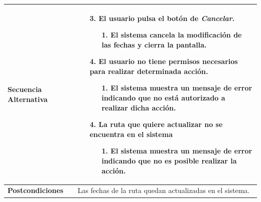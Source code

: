 \begin{longtable}{| p{4cm} | p{10cm} |}
\hline
\textbf{Secuencia Alternativa} &\mbox{}\par\vspace{-\baselineskip}
\begin{enumerate}[leftmargin=0.9cm, topsep=0.1cm]
\item[3.] El usuario pulsa el botón de \textit{Cancelar}.
	\begin{itemize}
	\item[1.] El sistema cancela la modificación de las fechas y cierra la pantalla.
	\end{itemize}
\item[4.] El usuario no tiene permisos necesarios para realizar determinada acción.
	\begin{itemize}
	\item[1.] El sistema muestra un mensaje de error indicando que no está autorizado a realizar dicha acción.
	\end{itemize}
\item[4.] La ruta que quiere actualizar no se encuentra en el sistema
	\begin{itemize}
	\item[1.] El sistema muestra un mensaje de error indicando que no es posible realizar la acción.
	\end{itemize}
\end{enumerate}
\\

\hline
\textbf{Postcondiciones} & 
Las fechas de la ruta quedan actualizadas en el sistema.\\
\hline
\end{longtable}



\newpage
